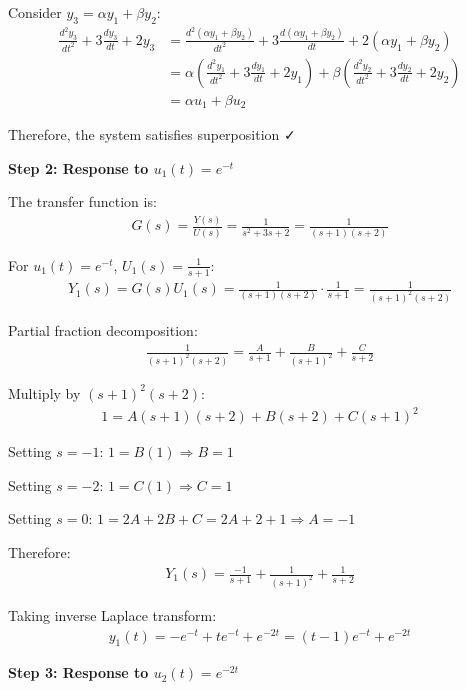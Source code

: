 \documentclass[11pt,a4paper]{article}
\begin{document}
Consider $y_3 = \alpha y_1 + \beta y_2$:
\begin{align}
  \frac{d^2y_3}{dt^2} + 3\frac{dy_3}{dt} + 2y_3 &= \frac{d^2(\alpha y_1 + \beta y_2)}{dt^2} + 3\frac{d(\alpha y_1 + \beta y_2)}{dt} + 2(\alpha y_1 + \beta y_2) \\
  &= \alpha\left(\frac{d^2y_1}{dt^2} + 3\frac{dy_1}{dt} + 2y_1\right) + \beta\left(\frac{d^2y_2}{dt^2} + 3\frac{dy_2}{dt} + 2y_2\right) \\
  &= \alpha u_1 + \beta u_2
\end{align}

Therefore, the system satisfies superposition ✓

\textbf{Step 2: Response to $u_1(t) = e^{-t}$}

The transfer function is:
\begin{align}
  G(s) = \frac{Y(s)}{U(s)} = \frac{1}{s^2 + 3s + 2} = \frac{1}{(s+1)(s+2)}
\end{align}

For $u_1(t) = e^{-t}$, $U_1(s) = \frac{1}{s+1}$:
\begin{align}
  Y_1(s) = G(s)U_1(s) = \frac{1}{(s+1)(s+2)} \cdot \frac{1}{s+1} = \frac{1}{(s+1)^2(s+2)}
\end{align}

Partial fraction decomposition:
\begin{align}
  \frac{1}{(s+1)^2(s+2)} = \frac{A}{s+1} + \frac{B}{(s+1)^2} + \frac{C}{s+2}
\end{align}

Multiply by $(s+1)^2(s+2)$:
\begin{align}
  1 = A(s+1)(s+2) + B(s+2) + C(s+1)^2
\end{align}

Setting $s = -1$: $1 = B(1) \Rightarrow B = 1$

Setting $s = -2$: $1 = C(1) \Rightarrow C = 1$

Setting $s = 0$: $1 = 2A + 2B + C = 2A + 2 + 1 \Rightarrow A = -1$

Therefore:
\begin{align}
  Y_1(s) = \frac{-1}{s+1} + \frac{1}{(s+1)^2} + \frac{1}{s+2}
\end{align}

Taking inverse Laplace transform:
\begin{align}
  y_1(t) = -e^{-t} + te^{-t} + e^{-2t} = (t-1)e^{-t} + e^{-2t}
\end{align}

\textbf{Step 3: Response to $u_2(t) = e^{-2t}$}
\end{document}
